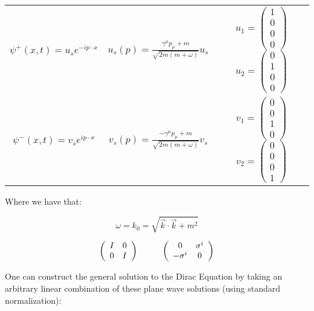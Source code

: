 \documentclass[a4]{article}
\begin{document}
    \begin{center}
        \begin{tabular}{c c c}
            $\psi^{+} (x, t) = u_{s} e^{- i p \cdot x}$ & $u_{s} (p) = \frac{\gamma^{\mu} p_{\mu} + m}{\sqrt{2m(m + \omega)}} u_{s}$ & $u_{1} = \left(\begin{array}{c} 1 \\ 0 \\ 0 \\ 0 \end{array}\right)$ $u_{2} = \left(\begin{array}{c} 0 \\ 1 \\ 0 \\ 0 \end{array}\right)$ \\
            $\psi^{-} (x, t) = v_{s} e^{ i p \cdot x}$ & $v_{s} (p) = \frac{- \gamma^{\mu} p_{\mu} + m}{\sqrt{2m(m + \omega)}} v_{s}$ & $v_{1} = \left(\begin{array}{c} 0 \\ 0 \\ 1 \\ 0 \end{array}\right)$ $v_{2} = \left(\begin{array}{c} 0 \\ 0 \\ 0 \\ 1 \end{array}\right)$
        \end{tabular}
    \end{center}

    Where we have that:

    \begin{equation}
        \omega = k_{0} = \sqrt{\vec{k} \cdot \vec{k} + m^{2}} 
    \end{equation}

    \begin{equation}
        \left(\begin{array}{cc} I & 0 \\ 0 & I \end{array}\right) \hspace*{1cm} \left(\begin{array}{cc} 0 & \sigma^{i} \\ - \sigma^{i} & 0 \end{array}\right)
    \end{equation}

    One can construct the general solution to the Dirac Equation by taking an arbitrary linear combination of
    these plane wave solutions (using standard normalization):
\end{document}

